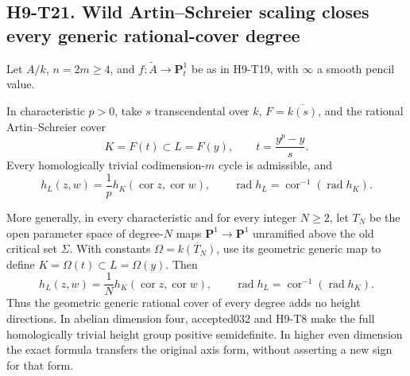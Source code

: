 
\subsection*{H9-T21. Wild Artin--Schreier scaling closes every generic rational-cover degree}

\begin{theorem}[H9-T21]
Let $A/k$, $n=2m\ge4$, and
$f:\widetilde A\to\mathbf P^1_t$ be as in H9-T19, with
$\infty$ a smooth pencil value.

In characteristic $p>0$, take $s$ transcendental over $k$,
$F=\overline{k(s)}$, and the rational Artin--Schreier cover
\[
        K=F(t)\subset L=F(y),\qquad
                     t=\frac{y^p-y}{s}.
                                                               \tag{H9.109}
\]
Every homologically trivial codimension-$m$ cycle is
admissible, and
\[
 h_L(z,w)=\frac1p h_K(\operatorname{cor}z,
                            \operatorname{cor}w),\qquad
 \operatorname{rad}h_L
       =\operatorname{cor}^{-1}(\operatorname{rad}h_K).
                                                               \tag{H9.110}
\]

More generally, in every characteristic and for every
integer $N\ge2$, let $T_N$ be the open parameter space of
degree-$N$ maps $\mathbf P^1\to\mathbf P^1$ unramified
above the old critical set $\Sigma$. With constants
$\Omega=\overline{k(T_N)}$, use its geometric generic map
to define $K=\Omega(t)\subset L=\Omega(y)$. Then
\[
 h_L(z,w)=\frac1N h_K(\operatorname{cor}z,
                            \operatorname{cor}w),\qquad
 \operatorname{rad}h_L
       =\operatorname{cor}^{-1}(\operatorname{rad}h_K).
                                                               \tag{H9.111}
\]
Thus the geometric generic rational cover of every degree
adds no height directions. In abelian dimension four,
accepted032 and H9-T8 make the full homologically trivial
height group positive semidefinite. In higher even
dimension the exact formula transfers the original axis
form, without asserting a new sign for that form.
\end{theorem}

